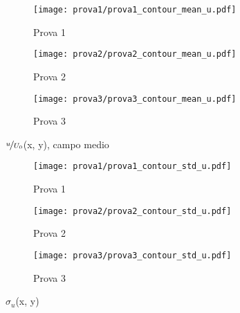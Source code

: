 \documentclass{article} %
\begin{document}
\clearpage
\begin{figure}[h!]
	\centering
	\begin{subfigure}{0.3\textwidth}
		\texttt{[image: prova1/prova1\_contour\_mean\_u.pdf]}
		\label{fig:MEAN_U_1}
		\caption{Prova 1}
	\end{subfigure} 
	\begin{subfigure}{0.3\textwidth}
		\texttt{[image: prova2/prova2\_contour\_mean\_u.pdf]}
		\label{fig:MEAN_U_2}
		\caption{Prova 2}		
	\end{subfigure}  
	\begin{subfigure}{0.3\textwidth}
		\texttt{[image: prova3/prova3\_contour\_mean\_u.pdf]}
		\label{fig:MEAN_U_3}
		\caption{Prova 3}
	\end{subfigure}  
      \caption{$\nicefrac{u}{U_0}$(x, y), campo medio}
      \label{fig:MEAN_U_123}
\end{figure}
\begin{figure}[h!]
	\centering
	\begin{subfigure}{0.3\textwidth}
		\texttt{[image: prova1/prova1\_contour\_std\_u.pdf]}
		\caption{Prova 1}
		\label{fig:STD_U_1}
	\end{subfigure} 
	\begin{subfigure}{0.3\textwidth}
		\texttt{[image: prova2/prova2\_contour\_std\_u.pdf]}
		\caption{Prova 2}
		\label{fig:STD_U_2}
	\end{subfigure}  
	\begin{subfigure}{0.3\textwidth}
		\texttt{[image: prova3/prova3\_contour\_std\_u.pdf]}
		\caption{Prova 3}
		\label{fig:STD_U_3}
	\end{subfigure}
      \caption{$\sigma_u$(x, y)}
      \label{fig:STD_U_123}
\end{figure}
\clearpage
\end{document}
